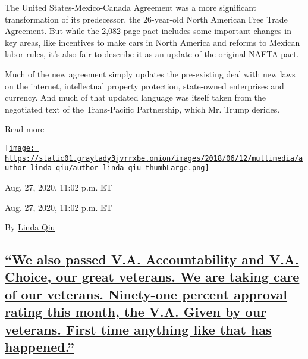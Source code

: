 The United States-Mexico-Canada Agreement was a more significant
transformation of its predecessor, the 26-year-old North American Free
Trade Agreement. But while the 2,082-page pact includes
\href{https://www.nytimes3xbfgragh.onion/2020/01/29/business/economy/usmca-deal.html}{some
important changes} in key areas, like incentives to make cars in North
America and reforms to Mexican labor rules, it's also fair to describe
it as an update of the original NAFTA pact.

Much of the new agreement simply updates the pre-existing deal with new
laws on the internet, intellectual property protection, state-owned
enterprises and currency. And much of that updated language was itself
taken from the negotiated text of the Trans-Pacific Partnership, which
Mr. Trump derides.

Read more

\href{https://www.nytimes3xbfgragh.onion/by/linda-qiu}{\texttt{[image: https://static01.graylady3jvrrxbe.onion/images/2018/06/12/multimedia/author-linda-qiu/author-linda-qiu-thumbLarge.png]}}

Aug. 27, 2020, 11:02 p.m. ET

Aug. 27, 2020, 11:02 p.m. ET

By \href{https://www.nytimes3xbfgragh.onion/by/linda-qiu}{Linda Qiu}

\hypertarget{we-also-passed-va-accountability-and-va-choice-our-great-veterans-we-are-taking-care-of-our-veterans-ninety-one-percent-approval-rating-this-month-the-va-given-by-our-veterans-first-time-anything-like-that-has-happened}{%
\subsection{\texorpdfstring{\protect\hyperlink{we-also-passed-va-accountability-and-va-choice-our-great-veterans-we-are-taking-care-of-our-veterans-ninety-one-percent-approval}{``We
also passed V.A. Accountability and V.A. Choice, our great veterans. We
are taking care of our veterans. Ninety-one percent approval rating this
month, the V.A. Given by our veterans. First time anything like that has
happened.''}}{``We also passed V.A. Accountability and V.A. Choice, our great veterans. We are taking care of our veterans. Ninety-one percent approval rating this month, the V.A. Given by our veterans. First time anything like that has happened.''}}\label{we-also-passed-va-accountability-and-va-choice-our-great-veterans-we-are-taking-care-of-our-veterans-ninety-one-percent-approval-rating-this-month-the-va-given-by-our-veterans-first-time-anything-like-that-has-happened}}

